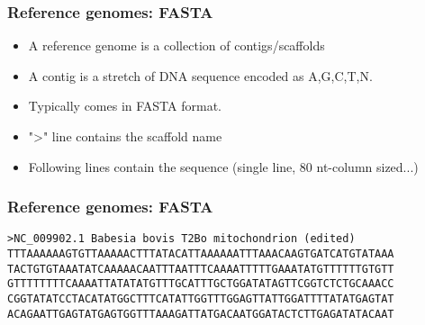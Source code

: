 \documentclass{beamer}
\begin{document}






\begin{frame}
  \frametitle{Reference genomes: FASTA}
  \begin{itemize}
  \item A reference genome is a collection of contigs/scaffolds
  \item  A contig is a stretch of DNA sequence encoded as A,G,C,T,N.	
  \item  Typically comes in FASTA format.		
  \item  ">" line contains the scaffold name
  \item  Following lines contain the sequence (single line, 80 nt-column sized...)
  \end{itemize}
\end{frame}

\begin{frame}[fragile]
  \frametitle{Reference genomes: FASTA}
\begin{small}
  \begin{verbatim}
>NC_009902.1 Babesia bovis T2Bo mitochondrion (edited)
TTTAAAAAAGTGTTAAAAACTTTATACATTAAAAAATTTAAACAAGTGATCATGTATAAA
TACTGTGTAAATATCAAAAACAATTTAATTTCAAAATTTTTGAAATATGTTTTTTGTGTT
GTTTTTTTTCAAAATTATATATGTTTGCATTTGCTGGATATAGTTCGGTCTCTGCAAACC
CGGTATATCCTACATATGGCTTTCATATTGGTTTGGAGTTATTGGATTTTATATGAGTAT
ACAGAATTGAGTATGAGTGGTTTAAAGATTATGACAATGGATACTCTTGAGATATACAAT
  \end{verbatim}
\end{small}
\end{frame}
\end{document}

